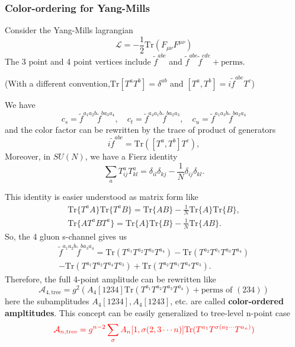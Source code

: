 \documentclass{beamer}
\begin{document}
\begin{frame}
    \frametitle{Color-ordering for Yang-Mills}
    Consider the Yang-Mills lagrangian
    \begin{equation*}
        \mathcal{L}=-\frac{1}{2}\mathrm{Tr}(F_{\mu\nu}F^{\mu\nu})
    \end{equation*}
    The 3 point and 4 point vertices include $\tilde{f}^{abc}$ and $\tilde{f}^{abe}\tilde{f}^{cde}+\text{perms}$.

    (With a different convention,$\textrm{Tr}[T^aT^b]=\delta^{ab}$ and $[T^a,T^b]=i\tilde{f}^{abc}T^c$)

    We have 
    \begin{equation*}
        c_s=\tilde{f}^{a_1a_2b}\tilde{f}^{ba_3a_4},\quad c_t=\tilde{f}^{a_4a_1b}\tilde{f}^{ba_2a_3},\quad c_u=\tilde{f}^{a_1a_3b}\tilde{f}^{ba_2a_4}
    \end{equation*}
    and the color factor can be rewritten by the trace of product of generators
    \begin{equation*}
        i\tilde{f}^{abc}=\mathrm{Tr}([T^a,T^b]T^c),
    \end{equation*}
    Moreover, in $SU(N)$, we have a Fierz identity
    \begin{equation}
        \sum_{a}T^a_{ij}T^a_{kl}=\delta_{il}\delta_{kj}-\frac{1}{N}\delta_{ij}\delta_{kl}.
    \end{equation}
\end{frame}
    
\begin{frame}
    This identity is easier understood as matrix form like 
    \begin{align*}
    \mathrm{Tr}\{T^aA\}\mathrm{Tr}\{T^aB\}=\mathrm{Tr}\{AB\}-\frac{1}{N}\mathrm{Tr}\{A\}\mathrm{Tr}\{B\},\\
    \mathrm{Tr}\{AT^aBT^a\}=\mathrm{Tr}\{A\}\mathrm{Tr}\{B\}-\frac{1}{N}\mathrm{Tr}\{AB\}.
    \end{align*}
    So, the 4 gluon s-channel gives us
    \begin{align*}
        \tilde{f}^{a_1a_2b}\tilde{f}^{ba_3a_4}=\mathrm{Tr}(T^{a_1}T^{a_2}T^{a_3}T^{a_4})-\mathrm{Tr}(T^{a_2}T^{a_1}T^{a_3}T^{a_4})\\
        -\mathrm{Tr}(T^{a_1}T^{a_2}T^{a_4}T^{a_3})+\mathrm{Tr}(T^{a_2}T^{a_1}T^{a_4}T^{a_3}).
    \end{align*}
    Therefore, the full 4-point amplitude can be rewritten like
    \begin{equation*}
        \mathcal{A}_{4,\text{tree}}=g^2(A_4[1234]\mathrm{Tr}(T^{a_1}T^{a_2}T^{a_3}T^{a_4})+\text{perms of } (234) )
    \end{equation*}
    here the subamplitudes $A_4[1234],A_4[1243]$, etc. are called \textbf{color-ordered ampltitudes}. This concept can be easily generalized to tree-level n-point case
    \begin{equation*}
        \textcolor{red}{\mathcal{A}_{n,\text{tree}}=g^{n-2}\sum_{\sigma}A_n[1,\sigma(2,3\cdots n)]\mathrm{Tr}(T^{a_1}T^{\sigma(a_2\cdots}T^{a_n)})}
    \end{equation*}
\end{frame}
\end{document}
